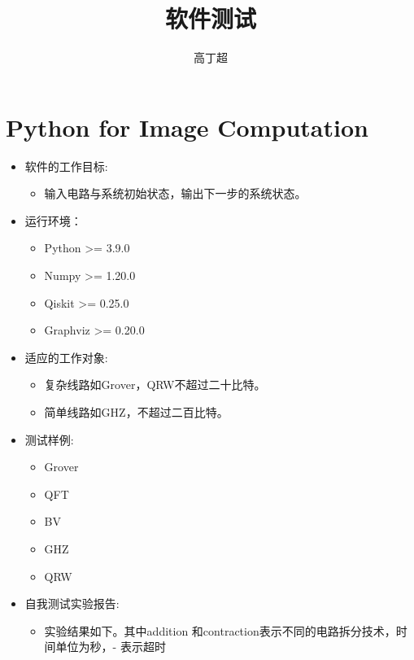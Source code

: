 \documentclass{article}
\title{软件测试}
\author{高丁超} %
\date{} %
\begin{document}
\maketitle

\section{Python for Image Computation}
\begin{itemize}[leftmargin=*]
    \item 软件的工作目标: 
    \begin{itemize}
        \item 输入电路与系统初始状态，输出下一步的系统状态。
    \end{itemize}
    \item 运行环境：
    \begin{itemize}
        \item Python >= 3.9.0
        \item Numpy >= 1.20.0
        \item Qiskit >= 0.25.0
        \item Graphviz >= 0.20.0
    \end{itemize} 
    \item 适应的工作对象:
    \begin{itemize}
        \item 复杂线路如Grover，QRW不超过二十比特。
        \item 简单线路如GHZ，不超过二百比特。
    \end{itemize}
    \item 测试样例:
    \begin{itemize}
        \item Grover
        \item QFT
        \item BV
        \item GHZ
        \item QRW
    \end{itemize}
    \item 自我测试实验报告:
    \begin{itemize}
        \item 实验结果如下。其中addition 和contraction表示不同的电路拆分技术，时间单位为秒，- 表示超时
    \begin{table}[!htbp]
        \centering
\end{table}
\end{itemize}
\end{itemize}
\end{document}
